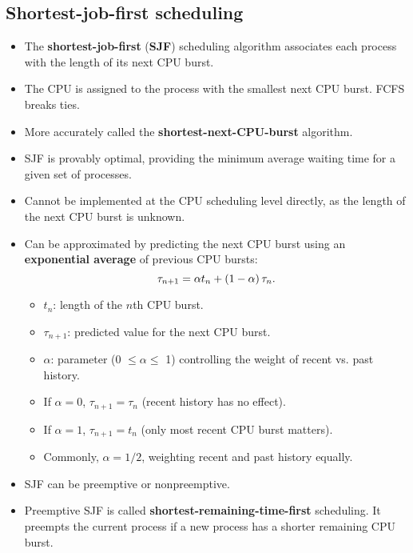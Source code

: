 \subsection{Shortest-job-first scheduling}
\begin{itemize}
    \item The \textbf{shortest-job-first} (\textbf{SJF}) scheduling algorithm associates each process with the length of its next CPU burst.
    \item The CPU is assigned to the process with the smallest next CPU burst. FCFS breaks ties.
    \item More accurately called the \textbf{shortest-next-CPU-burst} algorithm.
    \item SJF is provably optimal, providing the minimum average waiting time for a given set of processes.
    \item Cannot be implemented at the CPU scheduling level directly, as the length of the next CPU burst is unknown.
    \item Can be approximated by predicting the next CPU burst using an \textbf{exponential average} of previous CPU bursts:
    \[{\tau _{n + 1}} = \alpha {t_n} + \left( {1 - \alpha } \right){\tau _n}{\rm{.}}\]
    \begin{itemize}
        \item $t_n$: length of the $n$th CPU burst.
        \item $\tau_{n+1}$: predicted value for the next CPU burst.
        \item $\alpha$: parameter (0 $\le \alpha \le$ 1) controlling the weight of recent vs. past history.
        \item If $\alpha = 0$, $\tau_{n+1} = \tau_n$ (recent history has no effect).
        \item If $\alpha = 1$, $\tau_{n+1} = t_n$ (only most recent CPU burst matters).
        \item Commonly, $\alpha = 1/2$, weighting recent and past history equally.
    \end{itemize}
    \item SJF can be preemptive or nonpreemptive.
    \item Preemptive SJF is called \textbf{shortest-remaining-time-first} scheduling. It preempts the current process if a new process has a shorter remaining CPU burst.
\end{itemize}

